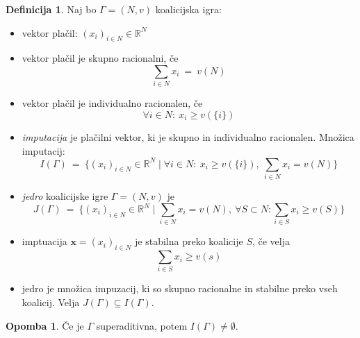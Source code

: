\documentclass[11pt]{article}
\newcommand{\R}{\mathbb{R}}
\newcommand{\set}[1]{\{#1\}}
\newcommand{\oklepaj}[1]{\left(#1\right)}
\newcommand{\x}{\mathbf{x}}
\newcommand{\1}{\mathbbm{1}}
\theoremstyle{definition}
\newtheorem{definicija}{Definicija}[section]
\theoremstyle{definition}
\theoremstyle{definition}
\theoremstyle{definition}
\newtheorem*{opomba}{Opomba}
\begin{document}
\begin{definicija}

Naj bo $\Gamma = (N,v)$ koalicijska igra:
\begin{itemize}
	\item vektor plačil: $(x_i)_{i \in N} \in \R^N$
	\item vektor plačil je skupno racionalni, če
	$$\sum_{i \in N} x_i ~=~ v(N)$$
	\item vektor plačil je individualno racionalen, če
	$$\forall i \in N: ~x_i \geq v\oklepaj{\set{i}}$$
	\item \textit{imputacija} je plačilni vektor, ki je skupno in individualno racionalen. Množica imputacij:
	$$I(\Gamma) ~=~ \big\{(x_i)_{i \in N}\in\R^N \mid \forall i \in N: ~x_i \geq v(\set{i}),~\sum_{i \in N}x_i = v(N)\big\}$$
	\item \textit{jedro} koalicijske igre $\Gamma = (N,v)$ je
	$$J(\Gamma) ~=~ \big\{(x_i)_{i \in N}\in\R^N \mid \sum_{i \in N}x_i = v(N),~\forall S \subset N: \sum_{i \in S}x_i \geq v(S)\big\}$$
	\item imptuacija $\x = (x_i)_{i \in N}$ je stabilna preko koalicije $S$, če velja
	$$\sum_{i \in S} x_i \geq v(s)$$
	\item jedro je množica impuzacij, ki so skupno racionalne in stabilne preko vseh koalicij. Velja $J(\Gamma) \subseteq I(\Gamma)$.
\end{itemize}

\end{definicija}
\vspace{0.5cm}

\begin{opomba}

Če je $\Gamma$ superaditivna, potem $I(\Gamma) \neq \emptyset$.

\end{opomba}
\vspace{0.5cm}
\end{document}
